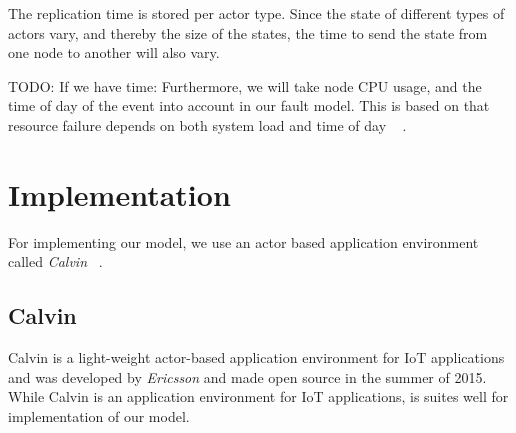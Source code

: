 \documentclass{cslthse-msc}
\begin{document}
The replication time is stored per actor type. Since the state of different types of actors vary, and thereby the size of the states, the time to send the state from one node to another will also vary. 

TODO: If we have time:
Furthermore, we will take node CPU usage, and the time of day of the event into account in our fault model. This is based on that resource failure depends on both system load and time of day ~\cite{implicationsOfFailures} \cite{studyOfFailures}.

\section{Implementation} \label{sec:design_implementation}
For implementing our model, we use an actor based application environment called \emph{Calvin} ~\cite{calvin}.

\subsection{Calvin} \label{subsec:design_calvin}
Calvin is a light-weight actor-based application environment for IoT applications and was developed by \emph{Ericsson} and made open source in the summer of 2015. While Calvin is an application environment for IoT applications, is suites well for implementation of our model.
\end{document}
